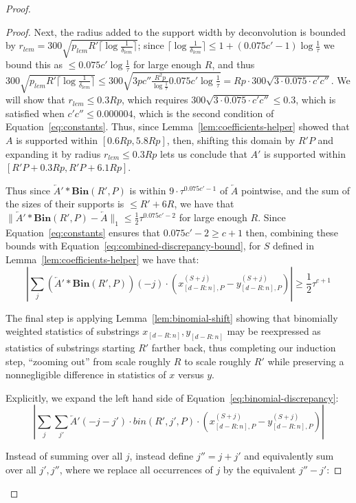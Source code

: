 \documentclass[11pt]{article}
\theoremstyle{plain}
\newcommand{\Bin}[2]{\textbf{Bin}(#1,#2)}
\begin{document}
\begin{proof}
\begin{proof}
    Next, the radius added to the support width by deconvolution is bounded by $r_{lem}=300\sqrt{p_{lem}R'\lceil\log\frac{1}{\delta_{lem}}\rceil}$; since $\lceil\log\frac{1}{\delta_{lem}}\rceil\leq 1+(0.075c'-1)\log\frac{1}{\tau}$ we bound this as $\leq 0.075c'\log\frac{1}{\tau}$ for large enough $R$, and thus $300\sqrt{p_{lem}R'\lceil\log\frac{1}{\delta_{lem}}\rceil}\leq 300\sqrt{3p c''\frac{R^2 p}{\log\frac{1}{\tau}} 0.075c'\log\frac{1}{\tau}}=Rp\cdot 300\sqrt{3\cdot 0.075\cdot c'c''}$. We will show that $r_{lem}\leq 0.3Rp$, which requires $300\sqrt{3\cdot 0.075\cdot c'c''}\leq 0.3$, which is satisfied when $c'c''\leq 0.000004$, which is the second condition of Equation~\ref{eq:constants}. Thus, since Lemma~\ref{lem:coefficients-helper} showed that $A$ is supported within $[0.6Rp,5.8Rp]$, then, shifting this domain by $R'P$ and expanding it by radius $r_{lem}\leq 0.3Rp$ lets us conclude that $A'$ is supported within $[R'P+0.3Rp,R'P+6.1Rp]$.

    Thus since $\overleftarrow{A}'\ast \Bin{R'}{P}$ is within $9\cdot \tau^{0.075c'-1}$ of $\overleftarrow{A}$ pointwise, and the sum of the sizes of their supports is $\leq R'+6R$, we have that $\|\overleftarrow{A}'\ast \Bin{R'}{P}-\overleftarrow{A}\|_1\leq \frac{1}{2}\tau^{0.075c'-2}$ for large enough $R$. Since Equation~\ref{eq:constants} ensures that $0.075c'-2\geq c+1$ then, combining these bounds with Equation~\ref{eq:combined-discrepancy-bound}, for $S$ defined in Lemma~\ref{lem:coefficients-helper} we have that: \begin{equation}\label{eq:binomial-discrepancy}|\sum_{j} (\overleftarrow{A}'\ast \Bin{R'}{P})(-j)\cdot(x_{[d-R:n],P}^{(S+j)}-y_{[d-R:n],P}^{(S+j)})|\geq \frac{1}{2}\tau^{c+1}\end{equation}

    The final step is applying Lemma~\ref{lem:binomial-shift} showing that binomially weighted statistics of substrings $x_{[d-R:n]},y_{[d-R:n]}$ may be reexpressed as statistics of substrings starting $R'$ farther back, thus completing our induction step, ``zooming out'' from scale roughly $R$ to scale roughly $R'$ while preserving a nonnegligible difference in statistics of $x$ versus $y$.

    Explicitly, we expand the left hand side of Equation~\ref{eq:binomial-discrepancy}:
\[|\sum_{j} \sum_{j'} \overleftarrow{A}'(-j-j')\cdot bin(R',j',P)\cdot(x_{[d-R:n],P}^{(S+j)}-y_{[d-R:n],P}^{(S+j)})|\]


    Instead of summing over all $j$, instead define $j''=j+j'$ and equivalently sum over all $j',j''$, where we replace all occurrences of $j$ by the equivalent $j''-j'$:


\end{proof}
\end{proof}
\end{document}
